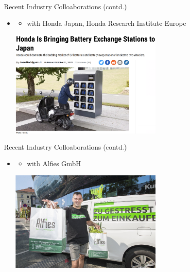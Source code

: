 \documentclass[aspectratio=1610]{beamer}
\begin{document}
\begin{frame}{Recent Industry Colloaborations (contd.)}
	\begin{itemize}
	\itemsep3.5ex
		\item {}
		\begin{itemize}
		\item with Honda Japan, Honda Research Institute Europe
		\end{itemize} 
	
		\bigskip
		\includegraphics[width=0.6\textwidth]{graphics/bex.png}
	\end{itemize}  
\end{frame}


\begin{frame}{Recent Industry Colloaborations (contd.)}
	\begin{itemize}
	\itemsep3.5ex
		\item {}
		\begin{itemize}
		\item with Alfies GmbH
		\end{itemize} 
	
		\bigskip
		\includegraphics[width=0.6\textwidth]{graphics/alfies.jpg}
	\end{itemize}  
\end{frame}
\end{document}
